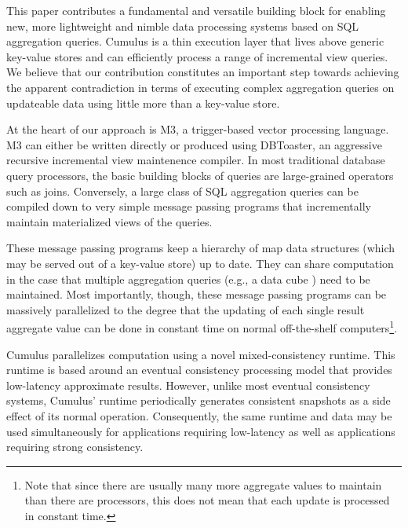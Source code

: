 \documentclass{vldb}
\begin{document}
This paper contributes a fundamental and versatile building block for enabling new, more lightweight and nimble data processing systems based on SQL aggregation queries.  Cumulus is a thin execution layer that lives above generic key-value stores and can efficiently process a range of incremental view queries.   We believe that our contribution constitutes an important step towards achieving the apparent contradiction in terms of executing complex aggregation queries on updateable data using little more than a key-value store.

At the heart of our approach is M3, a trigger-based vector processing language.  M3 can either be written directly or produced using DBToaster\cite{1687592}, an aggressive recursive incremental view maintenence compiler.  In most traditional database query processors, the  basic building blocks of queries are large-grained operators such as joins.  Conversely, a large class of SQL aggregation queries can be compiled down to very simple message passing programs that incrementally maintain materialized views of the queries.

These message passing programs keep a hierarchy of map data structures (which may be served out of a key-value store) up to date. They can share computation in the case that multiple aggregation queries (e.g., a data cube \cite{datacube}) need to be maintained.  Most importantly, though, these message passing programs can be massively parallelized to the degree that the updating of each single result aggregate value can be done in constant time on normal off-the-shelf computers\footnote{Note that since there are
usually many more aggregate values to maintain than there are processors,
this does not mean that each update is processed in constant time.}.

Cumulus parallelizes computation using a novel mixed-consistency runtime.  This runtime is based around an eventual consistency processing model that provides low-latency approximate results.  However, unlike most eventual consistency systems, Cumulus' runtime periodically generates consistent snapshots as a side effect of its normal operation.  Consequently, the same runtime and data may be used simultaneously for applications requiring low-latency as well as applications requiring strong consistency.
\end{document}
